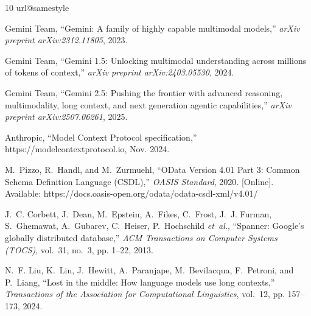 \documentclass[conference,10pt]{IEEEtran}
\begin{document}

\begin{thebibliography}{10}
\providecommand{\url}[1]{#1}
\csname url@samestyle\endcsname
\providecommand{\newblock}{\relax}
\providecommand{\bibinfo}[2]{#2}
\providecommand{\BIBentrySTDinterwordspacing}{\spaceskip=0pt\relax}
\providecommand{\BIBentryALTinterwordstretchfactor}{4}
\providecommand{\BIBentryALTinterwordspacing}{\spaceskip=\fontdimen2\font plus
\BIBentryALTinterwordstretchfactor\fontdimen3\font minus
  \fontdimen4\font\relax}
\providecommand{\BIBforeignlanguage}[2]{{%
\expandafter\ifx\csname l@#1\endcsname\relax
\typeout{** WARNING: IEEEtran.bst: No hyphenation pattern has been}%
\typeout{** loaded for the language `#1'. Using the pattern for}%
\typeout{** the default language instead.}%
\else
\language=\csname l@#1\endcsname
\fi
#2}}
\providecommand{\BIBdecl}{\relax}
\BIBdecl

{Gemini Team}, ``Gemini: A family of highly capable multimodal models,'' \emph{arXiv preprint arXiv:2312.11805}, 2023.

{Gemini Team}, ``Gemini 1.5: Unlocking multimodal understanding across millions of tokens of context,'' \emph{arXiv preprint arXiv:2403.05530}, 2024.

{Gemini Team}, ``Gemini 2.5: Pushing the frontier with advanced reasoning, multimodality, long context, and next generation agentic capabilities,'' \emph{arXiv preprint arXiv:2507.06261}, 2025.

Anthropic, ``Model Context Protocol specification,'' \url{https://modelcontextprotocol.io}, Nov. 2024.

M.~Pizzo, R.~Handl, and M.~Zurmuehl, ``{OData} Version 4.01 Part 3: Common Schema Definition Language ({CSDL}),'' \emph{OASIS Standard}, 2020. [Online]. Available: \url{https://docs.oasis-open.org/odata/odata-csdl-xml/v4.01/}

J.~C. Corbett, J.~Dean, M.~Epstein, A.~Fikes, C.~Frost, J.~J. Furman, S.~Ghemawat, A.~Gubarev, C.~Heiser, P.~Hochschild \emph{et~al.}, ``Spanner: {Google's} globally distributed database,'' \emph{ACM Transactions on Computer Systems (TOCS)}, vol.~31, no.~3, pp. 1--22, 2013.

N.~F. Liu, K.~Lin, J.~Hewitt, A.~Paranjape, M.~Bevilacqua, F.~Petroni, and P.~Liang, ``Lost in the middle: How language models use long contexts,'' \emph{Transactions of the Association for Computational Linguistics}, vol.~12, pp. 157--173, 2024.


\end{thebibliography}
\end{document}
